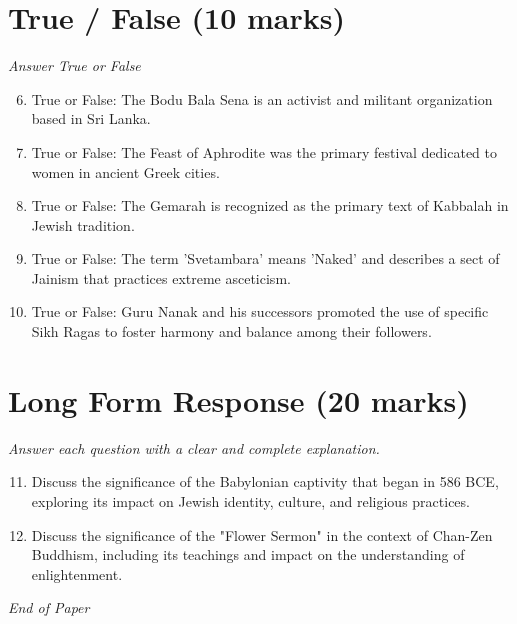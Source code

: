 \documentclass[12pt]{article}
\begin{document}
\section*{True / False (10 marks)}
\textit{Answer True or False}
\begin{enumerate}[label=\arabic*.]
\setcounter{enumi}{5}
\item True or False: The Bodu Bala Sena is an activist and militant organization based in Sri Lanka.
\item True or False: The Feast of Aphrodite was the primary festival dedicated to women in ancient Greek cities.
\item True or False: The Gemarah is recognized as the primary text of Kabbalah in Jewish tradition.
\item True or False: The term 'Svetambara' means 'Naked' and describes a sect of Jainism that practices extreme asceticism.
\item True or False: Guru Nanak and his successors promoted the use of specific Sikh Ragas to foster harmony and balance among their followers.
\end{enumerate}

\section*{Long Form Response (20 marks)}
\textit{Answer each question with a clear and complete explanation.}
\begin{enumerate}[label=\arabic*.]
\setcounter{enumi}{10}
\item Discuss the significance of the Babylonian captivity that began in 586 BCE, exploring its impact on Jewish identity, culture, and religious practices.
\item Discuss the significance of the "Flower Sermon" in the context of Chan-Zen Buddhism, including its teachings and impact on the understanding of enlightenment.
\end{enumerate}

\vfill
\noindent\textit{End of Paper}
\end{document}
